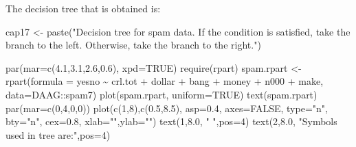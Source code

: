 \documentclass[
  10pt,
  b5paper]{book}
\newenvironment{Shaded}{\begin{snugshade}}{\end{snugshade}}
\newcommand{\AttributeTok}[1]{\textcolor[rgb]{0.77,0.63,0.00}{#1}}
\newcommand{\ConstantTok}[1]{\textcolor[rgb]{0.00,0.00,0.00}{#1}}
\newcommand{\DecValTok}[1]{\textcolor[rgb]{0.00,0.00,0.81}{#1}}
\newcommand{\FloatTok}[1]{\textcolor[rgb]{0.00,0.00,0.81}{#1}}
\newcommand{\FunctionTok}[1]{\textcolor[rgb]{0.00,0.00,0.00}{#1}}
\newcommand{\NormalTok}[1]{#1}
\newcommand{\OtherTok}[1]{\textcolor[rgb]{0.56,0.35,0.01}{#1}}
\newcommand{\SpecialCharTok}[1]{\textcolor[rgb]{0.00,0.00,0.00}{#1}}
\newcommand{\StringTok}[1]{\textcolor[rgb]{0.31,0.60,0.02}{#1}}
\begin{document}
The decision tree that is obtained is:

\begin{Shaded}
\begin{Highlighting}[]
\NormalTok{cap17 }\OtherTok{\textless{}{-}} \FunctionTok{paste}\NormalTok{(}\StringTok{"Decision tree for spam data. If the condition is satisfied, take}
\StringTok{               the branch to the left.  Otherwise, take the branch to the right."}\NormalTok{)}
\end{Highlighting}
\end{Shaded}

\begin{Shaded}
\begin{Highlighting}[]
\FunctionTok{par}\NormalTok{(}\AttributeTok{mar=}\FunctionTok{c}\NormalTok{(}\FloatTok{4.1}\NormalTok{,}\FloatTok{3.1}\NormalTok{,}\FloatTok{2.6}\NormalTok{,}\FloatTok{0.6}\NormalTok{), }\AttributeTok{xpd=}\ConstantTok{TRUE}\NormalTok{)}
\FunctionTok{require}\NormalTok{(rpart)}
\NormalTok{spam.rpart }\OtherTok{\textless{}{-}} \FunctionTok{rpart}\NormalTok{(}\AttributeTok{formula =}\NormalTok{ yesno }\SpecialCharTok{\textasciitilde{}}\NormalTok{ crl.tot }\SpecialCharTok{+}\NormalTok{ dollar }\SpecialCharTok{+}\NormalTok{ bang }\SpecialCharTok{+}
\NormalTok{   money }\SpecialCharTok{+}\NormalTok{ n000 }\SpecialCharTok{+}\NormalTok{ make, }\AttributeTok{data=}\NormalTok{DAAG}\SpecialCharTok{::}\NormalTok{spam7)}
\FunctionTok{plot}\NormalTok{(spam.rpart, }\AttributeTok{uniform=}\ConstantTok{TRUE}\NormalTok{)}
\FunctionTok{text}\NormalTok{(spam.rpart)}
\FunctionTok{par}\NormalTok{(}\AttributeTok{mar=}\FunctionTok{c}\NormalTok{(}\DecValTok{0}\NormalTok{,}\DecValTok{4}\NormalTok{,}\DecValTok{0}\NormalTok{,}\DecValTok{0}\NormalTok{))}
\FunctionTok{plot}\NormalTok{(}\FunctionTok{c}\NormalTok{(}\DecValTok{1}\NormalTok{,}\DecValTok{8}\NormalTok{),}\FunctionTok{c}\NormalTok{(}\FloatTok{0.5}\NormalTok{,}\FloatTok{8.5}\NormalTok{), }\AttributeTok{asp=}\FloatTok{0.4}\NormalTok{, }\AttributeTok{axes=}\ConstantTok{FALSE}\NormalTok{, }\AttributeTok{type=}\StringTok{"n"}\NormalTok{, }\AttributeTok{bty=}\StringTok{"n"}\NormalTok{, }\AttributeTok{cex=}\FloatTok{0.8}\NormalTok{, }\AttributeTok{xlab=}\StringTok{""}\NormalTok{,}\AttributeTok{ylab=}\StringTok{""}\NormalTok{)}
\FunctionTok{text}\NormalTok{(}\DecValTok{1}\NormalTok{,}\FloatTok{8.0}\NormalTok{, }\StringTok{"  "}\NormalTok{,}\AttributeTok{pos=}\DecValTok{4}\NormalTok{)}
\FunctionTok{text}\NormalTok{(}\DecValTok{2}\NormalTok{,}\FloatTok{8.0}\NormalTok{, }\StringTok{"Symbols used in tree are:"}\NormalTok{,}\AttributeTok{pos=}\DecValTok{4}\NormalTok{)}

\end{Highlighting}
\end{Shaded}
\end{document}
